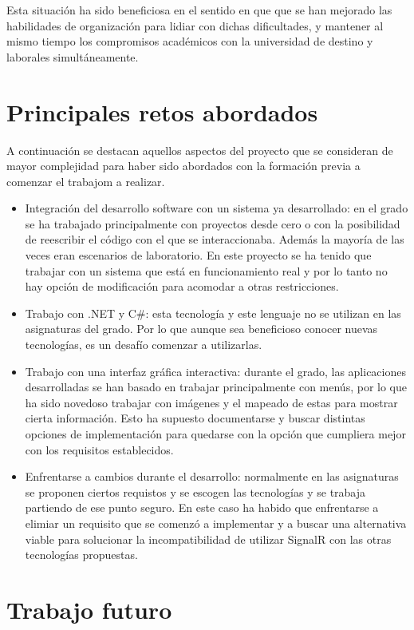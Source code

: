 Esta situación ha sido beneficiosa en el sentido en que que se han mejorado las habilidades de organización para lidiar con dichas dificultades, y mantener al mismo tiempo los compromisos académicos con la universidad de destino y laborales simultáneamente.

\section{Principales retos abordados}

A continuación se destacan aquellos aspectos del proyecto que se consideran de mayor complejidad para haber sido abordados con la formación previa a comenzar el trabajom a realizar. 
\begin{itemize}
    \item Integración del desarrollo software con un sistema ya desarrollado: en el grado se ha trabajado principalmente con proyectos desde cero o con la posibilidad de reescribir el código con el que se interaccionaba. Además la mayoría de las veces eran escenarios de laboratorio. En este proyecto se ha tenido que trabajar con un sistema que está en funcionamiento real y por lo tanto no hay opción de modificación para acomodar a otras restricciones.
    \item Trabajo con .NET y C\#: esta tecnología y este lenguaje no se utilizan en las asignaturas del grado. Por lo que aunque sea beneficioso conocer nuevas tecnologías, es un desafío comenzar a utilizarlas.
    \item Trabajo con una interfaz gráfica interactiva: durante el grado, las aplicaciones desarrolladas se han basado en trabajar principalmente con menús, por lo que ha sido novedoso trabajar con imágenes y el mapeado de estas para mostrar cierta información. Esto ha supuesto documentarse y buscar distintas opciones de implementación para quedarse con la opción que cumpliera mejor con los requisitos establecidos.
    \item Enfrentarse a cambios durante el desarrollo: normalmente en las asignaturas se proponen ciertos requistos y se escogen las tecnologías y se trabaja partiendo de ese punto seguro. En este caso ha habido que enfrentarse a elimiar un requisito que se comenzó a implementar y a buscar una alternativa viable para solucionar la incompatibilidad de utilizar SignalR con las otras tecnologías propuestas.
\end{itemize}


\section{Trabajo futuro}
\label{section-trabajo-futuro}

